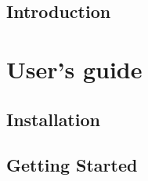 \documentclass[11pt, a4paper]{book}
\begin{document}


\tableofcontents

\pagebreak 


\setcounter{page}{1} 


\chapter{Introduction}
\label{chapter:introduction}



\part{User's guide} 
\label{part:user} 


\chapter{Installation}
\label{chapter:installation}



\chapter{Getting Started}
\label{chapter:start}



\end{document}
